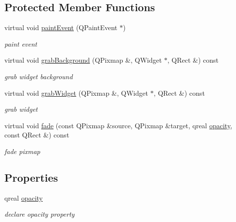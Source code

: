 \subsection*{Protected Member Functions}
\begin{DoxyCompactItemize}
\item 
\mbox{\label{class_transition_widget_a879aef2d6ee3028135f5ad51ee7be9d0}} 
virtual void \hyperlink{class_transition_widget_a879aef2d6ee3028135f5ad51ee7be9d0}{paint\+Event} (Q\+Paint\+Event $\ast$)
\begin{DoxyCompactList}\small\item\em paint event \end{DoxyCompactList}\item 
virtual void \hyperlink{class_transition_widget_a3658e4ec4c80e864a409ee94f9ac1d74}{grab\+Background} (Q\+Pixmap \&, Q\+Widget $\ast$, Q\+Rect \&) const
\begin{DoxyCompactList}\small\item\em grab widget background \end{DoxyCompactList}\item 
\mbox{\label{class_transition_widget_a6550becca8008f83394d3441b12e788a}} 
virtual void \hyperlink{class_transition_widget_a6550becca8008f83394d3441b12e788a}{grab\+Widget} (Q\+Pixmap \&, Q\+Widget $\ast$, Q\+Rect \&) const
\begin{DoxyCompactList}\small\item\em grab widget \end{DoxyCompactList}\item 
\mbox{\label{class_transition_widget_ae1fee02480b2aa93e193de80ebd49034}} 
virtual void \hyperlink{class_transition_widget_ae1fee02480b2aa93e193de80ebd49034}{fade} (const Q\+Pixmap \&source, Q\+Pixmap \&target, qreal \hyperlink{class_transition_widget_a554a603f246f14063df529afca088e7d}{opacity}, const Q\+Rect \&) const
\begin{DoxyCompactList}\small\item\em fade pixmap \end{DoxyCompactList}\end{DoxyCompactItemize}
\subsection*{Properties}
\begin{DoxyCompactItemize}
\item 
\mbox{\label{class_transition_widget_a554a603f246f14063df529afca088e7d}} 
qreal \hyperlink{class_transition_widget_a554a603f246f14063df529afca088e7d}{opacity}
\begin{DoxyCompactList}\small\item\em declare opacity property \end{DoxyCompactList}\end{DoxyCompactItemize}
